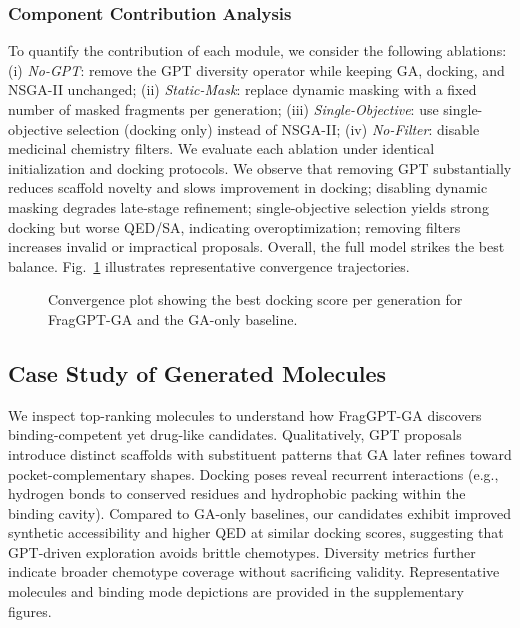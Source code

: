 \documentclass[lettersize,journal]{IEEEtran}
\begin{document}
\subsubsection{Component Contribution Analysis}
To quantify the contribution of each module, we consider the following ablations: (i) \textit{No-GPT}: remove the GPT diversity operator while keeping GA, docking, and NSGA-II unchanged; (ii) \textit{Static-Mask}: replace dynamic masking with a fixed number of masked fragments per generation; (iii) \textit{Single-Objective}: use single-objective selection (docking only) instead of NSGA-II; (iv) \textit{No-Filter}: disable medicinal chemistry filters. We evaluate each ablation under identical initialization and docking protocols. We observe that removing GPT substantially reduces scaffold novelty and slows improvement in docking; disabling dynamic masking degrades late-stage refinement; single-objective selection yields strong docking but worse QED/SA, indicating overoptimization; removing filters increases invalid or impractical proposals. Overall, the full model strikes the best balance. Fig.~\ref{fig:convergence} illustrates representative convergence trajectories.
\begin{figure}[!t]
\centering
\caption{Convergence plot showing the best docking score per generation for FragGPT-GA and the GA-only baseline.}
\label{fig:convergence}
\end{figure}
\subsection{Case Study of Generated Molecules}
We inspect top-ranking molecules to understand how FragGPT-GA discovers binding-competent yet drug-like candidates. Qualitatively, GPT proposals introduce distinct scaffolds with substituent patterns that GA later refines toward pocket-complementary shapes. Docking poses reveal recurrent interactions (e.g., hydrogen bonds to conserved residues and hydrophobic packing within the binding cavity). Compared to GA-only baselines, our candidates exhibit improved synthetic accessibility and higher QED at similar docking scores, suggesting that GPT-driven exploration avoids brittle chemotypes. Diversity metrics further indicate broader chemotype coverage without sacrificing validity. Representative molecules and binding mode depictions are provided in the supplementary figures.
\end{document}

